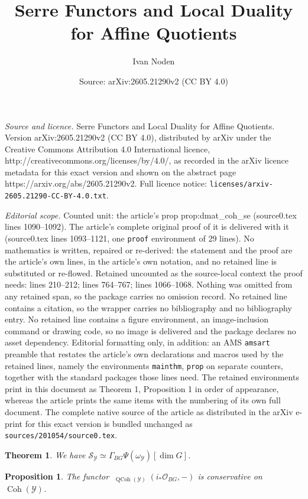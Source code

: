 \documentclass[10pt,a4paper]{amsart}
\title{Serre Functors and Local Duality for Affine Quotients}
\author{Ivan Noden}
\date{Source: arXiv:2605.21290v2 (CC BY 4.0)}
\newtheorem{mainthm}{Theorem}
\newtheorem{prop}{Proposition}
\DeclareMathOperator{\Coh}{\catfont{Coh}}
\renewcommand{\O}{\mathcal{O}}
\DeclareMathOperator{\QCoh}{\catfont{QCoh}}
\renewcommand{\S}{\mathcal{S}}
\newcommand{\Y}{\mathcal{Y}}
\newcommand{\catfont}{\mathrm}
\newcommand{\localcoh}{\Gamma_{BG}}
\DeclareMathOperator{\uHom}{\underline{\mathcal{H}om}}
\begin{document}
\maketitle

\noindent\emph{Source and licence.} Serre Functors and Local Duality for Affine Quotients. Version arXiv:2605.21290v2 (CC BY 4.0), distributed by arXiv under the Creative Commons Attribution 4.0 International licence, http://creativecommons.org/licenses/by/4.0/, as recorded in the arXiv licence metadata for this exact version and shown on the abstract page https://arxiv.org/abs/2605.21290v2. Full licence notice: \texttt{licenses/arxiv-2605.21290-CC-BY-4.0.txt}.\par\smallskip

\noindent\textit{Editorial scope.} Counted unit: the article's prop prop:dmat\_coh\_se (source0.tex lines 1090--1092). The article's complete original proof of it is delivered with it (source0.tex lines 1093--1121, one \texttt{proof} environment of 29 lines). No mathematics is written, repaired or re-derived: the statement and the proof are the article's own lines, in the article's own notation, and no retained line is substituted or re-flowed.  Retained uncounted as the source-local context the proof needs: lines 210--212; lines 764--767; lines 1066--1068.  Nothing was omitted from any retained span, so the package carries no omission record.  No retained line contains a citation, so the wrapper carries no bibliography and no bibliography entry.  No retained line contains a figure environment, an image-inclusion command or drawing code, so no image is delivered and the package declares no asset dependency.  Editorial formatting only, in addition: an AMS \texttt{amsart} preamble that restates the article's own declarations and macros used by the retained lines, namely the environments \texttt{mainthm}, \texttt{prop} on separate counters, together with the standard packages those lines need.  The retained environments print in this document as Theorem 1, Proposition 1 in order of appearance, whereas the article prints the same items with the numbering of its own full document.  The complete native source of the article as distributed in the arXiv e-print for this exact version is bundled unchanged as \texttt{sources/201054/source0.tex}.
  \begin{mainthm}\label{thm:serre_functor}
    We have \(\S_\Y \simeq \localcoh \Psi(\omega_\Y)[\dim G]\).
  \end{mainthm}

  \begin{prop}\label{prop:k_generates}
    The functor \(\uHom_{\QCoh(\Y)}(i_\ast \O_{BG}, -)\) is conservative
    on \(\Coh(\Y)\).
  \end{prop}
\end{document}
